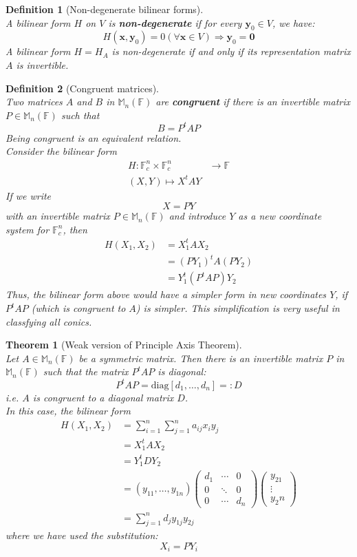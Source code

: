 \documentclass[12pt]{article}
\newtheorem{definition}{Definition}[section]
\newtheorem{theorem}{Theorem}[section]
\theoremstyle{definition}
\begin{document}
\begin{definition}[Non-degenerate bilinear forms]
\hfill\\\normalfont A bilinear form $H$ on $V$ is \textbf{non-degenerate} if for every $\mathbf{y}_0\in V$, we have:
\[
H(\mathbf{x},\mathbf{y}_0)=0(\forall \mathbf{x}\in V)\Rightarrow \mathbf{y}_0=\mathbf{0}
\]
A bilinear form $H=H_A$ is non-degenerate if and only if its representation matrix $A$ is invertible.
\end{definition}
\begin{definition}[Congruent matrices]
\hfill\\\normalfont Two matrices $A$ and $B$ in $\mathbb{M}_n(\mathbb{F})$ are \textbf{congruent} if there is an invertible matrix $P\in\mathbb{M}_n(\mathbb{F})$ such that
\[
B=P^tAP
\]
Being congruent is an equivalent relation.\\
Consider the bilinear form
\[
\begin{aligned}
H:\mathbb{F}_c^n\times \mathbb{F}_c^n&\to \mathbb{F}\\
(X,Y)\mapsto X^tAY
\end{aligned}
\]
If we write
\[
X=PY
\]
with an invertible matrix $P\in\mathbb{M}_n(\mathbb{F})$ and introduce $Y$ as a new coordinate system for $\mathbb{F}_c^n$, then
\[
\begin{aligned}
H(X_1,X_2)&=X_1^tAX_2\\
&=(PY_1)^tA(PY_2)\\
&=Y_1^t(P^tAP)Y_2
\end{aligned}
\]
Thus, the bilinear form above would have a simpler form in new coordinates $Y$, if $P^tAP$ (which is congruent to $A$) is simpler. This simplification is very useful in classfying all conics.
\end{definition}
\begin{theorem}[Weak version of Principle Axis Theorem]
\hfill\\\normalfont Let $A\in\mathbb{M}_n(\mathbb{F})$ be a symmetric matrix. Then there is an invertible matrix $P$ in $\mathbb{M}_n(\mathbb{F})$ such that the matrix $P^tAP$ is diagonal:
\[
P^tAP=\text{diag}[d_1,\ldots, d_n]=:D
\]
i.e. $A$ is congruent to a diagonal matrix $D$.\\
In this case, the bilinear form
\[
\begin{aligned}
H(X_1, X_2)&=\sum_{i=1}^n\sum_{j=1}^n a_{ij}x_iy_j\\
&=X_1^tAX_2\\
&=Y_1^tDY_2\\
&=(y_{11},\ldots,y_{1n})\begin{pmatrix}
d_{1}&\cdots&0\\
0&\ddots&0\\
0&\cdots&d_{n}
\end{pmatrix}\begin{pmatrix}
y_21\\
\vdots\\
y_2n
\end{pmatrix}\\
&=\sum_{j=1}^n d_jy_{1j}y_{2j}
\end{aligned}
\]
where we have used the substitution:
\[
X_i=PY_i
\]
\end{theorem}
\end{document}
